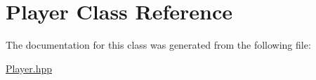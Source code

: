 \hypertarget{classPlayer}{}\section{Player Class Reference}
\label{classPlayer}


The documentation for this class was generated from the following file\+:\begin{DoxyCompactItemize}
\item 
\hyperlink{Player_8hpp}{Player.\+hpp}\end{DoxyCompactItemize}
